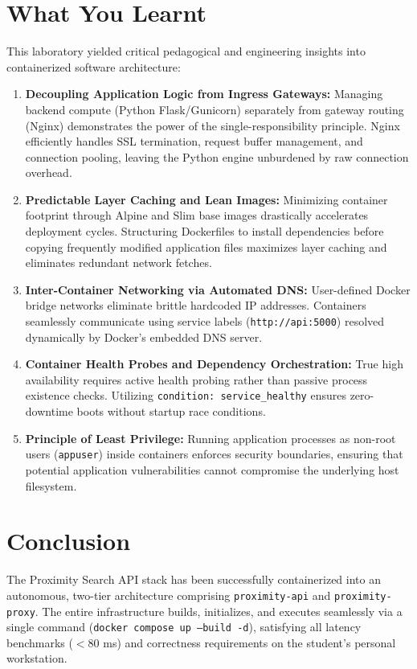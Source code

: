 \documentclass[11pt,a4paper]{article}
\begin{document}
\section{What You Learnt}

This laboratory yielded critical pedagogical and engineering insights into containerized software architecture:

\begin{enumerate}
    \item \textbf{Decoupling Application Logic from Ingress Gateways:} Managing backend compute (Python Flask/Gunicorn) separately from gateway routing (Nginx) demonstrates the power of the single-responsibility principle. Nginx efficiently handles SSL termination, request buffer management, and connection pooling, leaving the Python engine unburdened by raw connection overhead.
    \item \textbf{Predictable Layer Caching and Lean Images:} Minimizing container footprint through Alpine and Slim base images drastically accelerates deployment cycles. Structuring Dockerfiles to install dependencies before copying frequently modified application files maximizes layer caching and eliminates redundant network fetches.
    \item \textbf{Inter-Container Networking via Automated DNS:} User-defined Docker bridge networks eliminate brittle hardcoded IP addresses. Containers seamlessly communicate using service labels (\texttt{http://api:5000}) resolved dynamically by Docker's embedded DNS server.
    \item \textbf{Container Health Probes and Dependency Orchestration:} True high availability requires active health probing rather than passive process existence checks. Utilizing \texttt{condition: service\_healthy} ensures zero-downtime boots without startup race conditions.
    \item \textbf{Principle of Least Privilege:} Running application processes as non-root users (\texttt{appuser}) inside containers enforces security boundaries, ensuring that potential application vulnerabilities cannot compromise the underlying host filesystem.
\end{enumerate}

\section{Conclusion}
The Proximity Search API stack has been successfully containerized into an autonomous, two-tier architecture comprising \texttt{proximity-api} and \texttt{proximity-proxy}. The entire infrastructure builds, initializes, and executes seamlessly via a single command (\texttt{docker compose up --build -d}), satisfying all latency benchmarks ($<80$ ms) and correctness requirements on the student's personal workstation.
\end{document}
